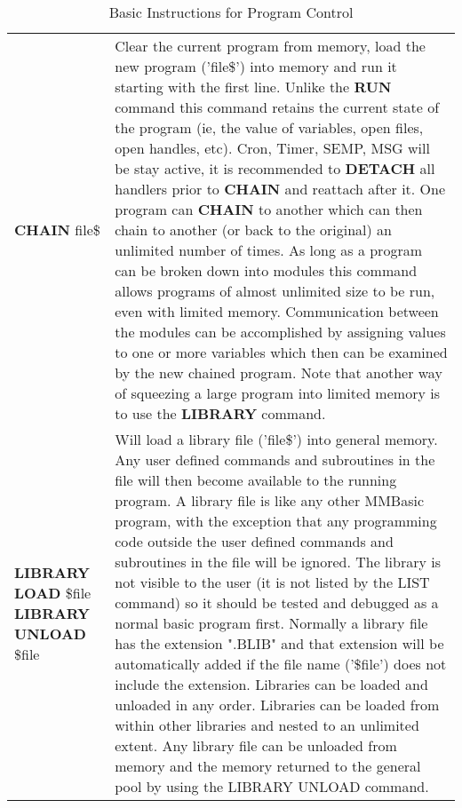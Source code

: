 \begin{table}[]
\centering
\caption{Basic Instructions for Program Control}
\label{Basic_Instructions_for_Program_Control}
\begin{tabular}{|p{4cm}|p{10cm}|}
\hline
\\ \hline
\textbf{CHAIN} file\$ 
& Clear the current program from memory, load the new program ('file\$')
into memory and run it starting with the first line.\newline
Unlike the \textbf{RUN} command this command retains the current state of the
program (ie, the value of variables, open files, open handles, etc). Cron, Timer, SEMP, MSG will be stay active, it is recommended to \textbf{DETACH} all handlers prior to \textbf{CHAIN} and reattach after it.\newline
One program can \textbf{CHAIN} to another which can then chain to another (or
back to the original) an unlimited number of times. As long as a
program can be broken down into modules this command allows
programs of almost unlimited size to be run, even with limited memory.\newline
Communication between the modules can be accomplished by assigning
values to one or more variables which then can be examined by the new
chained program.
Note that another way of squeezing a large program into limited memory
is to use the \textbf{LIBRARY} command.
\\ \hline
\textbf{LIBRARY LOAD} \$file\newline
\textbf{LIBRARY UNLOAD} \$file
& Will load a library file ('file\$') into general memory. Any user defined
commands and subroutines in the file will then become available to the
running program.\newline 
A library file is like any other MMBasic program, with the exception
that any programming code outside the user defined commands and
subroutines in the file will be ignored. The library is not visible to the
user (it is not listed by the LIST command) so it should be tested and
debugged as a normal basic program first. Normally a library file has
the extension ".BLIB" and that extension will be automatically added if
the file name ('\$file') does not include the extension.\newline
Libraries can be loaded and unloaded in any order. Libraries can be
loaded from within other libraries and nested to an unlimited extent.
Any library file can be unloaded from memory and the memory returned
to the general pool by using the LIBRARY UNLOAD command.\newline

\end{tabular}
\end{table}
